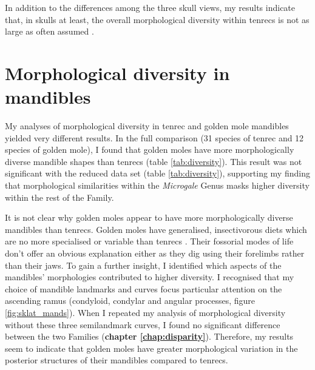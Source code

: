 	
	In addition to the differences among the three skull views, my results indicate that, in skulls at least, the overall morphological diversity within tenrecs is not as large as often assumed \citep[e.g.][]{Eisenberg1969, Olson2013}. 

\section{Morphological diversity in mandibles}
	My analyses of morphological diversity in tenrec and golden mole mandibles yielded very different results. In the full comparison (31 species of tenrec and 12 species of golden mole), I found that golden moles have more morphologically diverse mandible shapes than tenrecs (table \ref{tab:diversity}). This result was not significant with the reduced data set (table \ref{tab:diversity}), supporting my finding that morphological similarities within the \textit{Microgale} Genus masks higher diversity within the rest of the Family.
	
	It is not clear why golden moles appear to have more morphologically diverse mandibles than tenrecs. Golden moles have generalised, insectivorous diets \citep{Bronner1995} which are no more specialised or variable than tenrecs \citep{Soarimalala2011}. Their fossorial modes of life don't offer an obvious explanation either as they dig using their forelimbs rather than their jaws.
	To gain a further insight, I identified which aspects of the mandibles' morphologies contributed to higher diversity. I recognised that 
	my choice of mandible landmarks and curves focus particular attention on the ascending ramus (condyloid, condylar and angular processes, figure \ref{fig:sklat_mands}). When I repeated my analysis of morphological diversity without these three semilandmark curves, I found no significant difference between the two Families (\textbf{chapter \ref{chap:disparity}}). Therefore, my results seem to indicate that golden moles have greater morphological variation in the posterior structures of their mandibles compared to tenrecs. 
	

